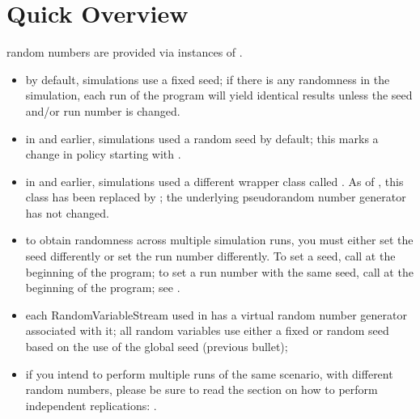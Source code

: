 \documentclass[letterpaper,10pt,english]{sphinxmanual}
\renewcommand{\sphinxcode}[1]{\texttt{\small{#1}}}
\begin{document}
\section{Quick Overview}
\label{\detokenize{random-variables:quick-overview}}
 random numbers are provided via instances of
\sphinxcode{}.
\begin{itemize}
\item {} 
by default,  simulations use a fixed seed; if there is any randomness in
the simulation, each run of the program will yield identical results unless
the seed and/or run number is changed.

\item {} 
in  and earlier,  simulations used a random seed by default; this
marks a change in policy starting with .

\item {} 
in  and earlier,  simulations used a different wrapper class
called \sphinxcode{}.  As of , this class has been
replaced by \sphinxcode{}; the underlying pseudo\sphinxhyphen{}random
number generator has not changed.

\item {} 
to obtain randomness across multiple simulation runs, you must either set the
seed differently or set the run number differently.  To set a seed, call
\sphinxcode{} at the beginning of the program; to set
a run number with the same seed, call \sphinxcode{} at
the beginning of the program; see {\hyperref[\detokenize{random-variables:seeding-and-independent-replications}]{}}.

\item {} 
each RandomVariableStream used in  has a virtual random number generator
associated with it; all random variables use either a fixed or random seed
based on the use of the global seed (previous bullet);

\item {} 
if you intend to perform multiple runs of the same scenario, with different
random numbers, please be sure to read the section on how to perform
independent replications: {\hyperref[\detokenize{random-variables:seeding-and-independent-replications}]{}}.

\end{itemize}
\end{document}
